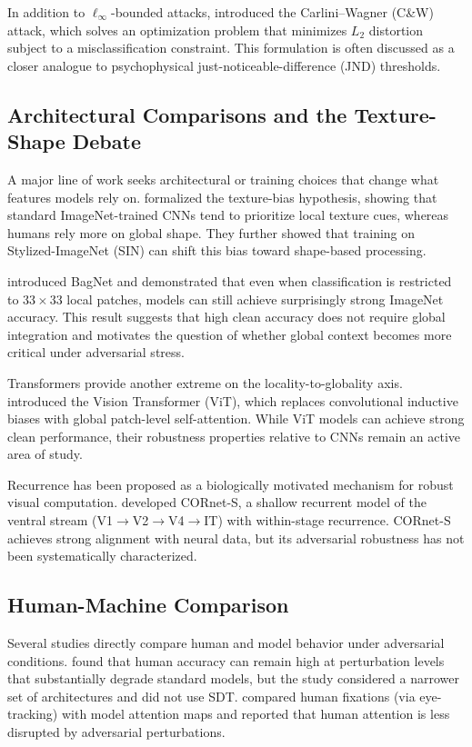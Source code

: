 \documentclass[12pt,a4paper]{article}
\begin{document}
In addition to $\ell_\infty$-bounded attacks, \citet{carlini2017towards}
introduced the Carlini--Wagner (C\&W) attack, which solves an
optimization problem that minimizes $L_2$ distortion subject to a
misclassification constraint. This formulation is often discussed as a
closer analogue to psychophysical just-noticeable-difference (JND)
thresholds.

\subsection{Architectural Comparisons and the Texture-Shape Debate}

A major line of work seeks architectural or training choices that change
what features models rely on. \citet{geirhos2019imagenet} formalized the
texture-bias hypothesis, showing that standard ImageNet-trained CNNs tend
to prioritize local texture cues, whereas humans rely more on global shape.
They further showed that training on Stylized-ImageNet (SIN) can shift this
bias toward shape-based processing.

\citet{brendel2019approximating} introduced BagNet and demonstrated that even
when classification is restricted to $33{\times}33$ local patches, models can
still achieve surprisingly strong ImageNet accuracy. This result suggests that
high clean accuracy does not require global integration and motivates the
question of whether global context becomes more critical under adversarial
stress.

Transformers provide another extreme on the locality-to-globality axis.
\citet{dosovitskiy2020image} introduced the Vision Transformer (ViT), which
replaces convolutional inductive biases with global patch-level self-attention.
While ViT models can achieve strong clean performance, their robustness
properties relative to CNNs remain an active area of study.

Recurrence has been proposed as a biologically motivated mechanism for
robust visual computation. \citet{kubilius2019brain} developed CORnet-S, a
shallow recurrent model of the ventral stream (V1$\to$V2$\to$V4$\to$IT) with
within-stage recurrence. CORnet-S achieves strong alignment with neural data,
but its adversarial robustness has not been systematically characterized.

\subsection{Human-Machine Comparison}

Several studies directly compare human and model behavior under adversarial
conditions. \citet{elsayed2018adversarial} found that human accuracy can remain
high at perturbation levels that substantially degrade standard models, but the
study considered a narrower set of architectures and did not use SDT.
\citet{zhou2020hiring} compared human fixations (via eye-tracking) with model
attention maps and reported that human attention is less disrupted by adversarial
perturbations.
\end{document}
